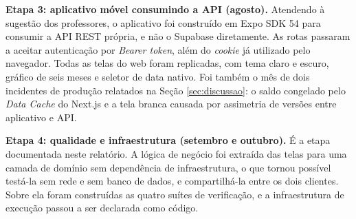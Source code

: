 \documentclass[12pt,a4paper]{article}
\begin{document}
\textbf{Etapa 3: aplicativo móvel consumindo a API (agosto).} Atendendo à
sugestão dos professores, o aplicativo foi construído
em Expo SDK 54 para consumir a API REST própria, e não o Supabase diretamente.
As rotas passaram a aceitar autenticação por \textit{Bearer token}, além do
\textit{cookie} já utilizado pelo navegador. Todas as telas do web foram
replicadas, com tema claro e escuro, gráfico de seis meses e seletor de data
nativo. Foi também o mês de dois incidentes de produção relatados na Seção
\ref{sec:discussao}: o saldo congelado pelo \textit{Data Cache} do Next.js e a
tela branca causada por assimetria de versões entre aplicativo e API.

\textbf{Etapa 4: qualidade e infraestrutura (setembro e outubro).} É a etapa
documentada neste relatório. A lógica de negócio foi extraída das telas para
uma camada de domínio sem dependência de infraestrutura, o que tornou possível
testá-la sem rede e sem banco de dados, e compartilhá-la entre os dois
clientes. Sobre ela foram construídas as quatro suítes de verificação, e a
infraestrutura de execução passou a ser declarada como código.
\end{document}
